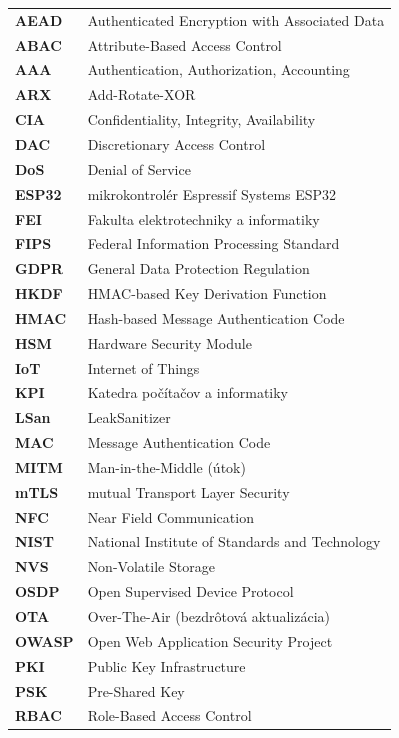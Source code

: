\documentclass[journal,a4paper,onecolumn]{IEEEtran}
\begin{document}
\bigskip\noindent
\begin{tabular}{>{\bfseries}p{2.8cm} p{12.2cm}}
AEAD   & Authenticated Encryption with Associated Data \\[2pt]
ABAC   & Attribute-Based Access Control \\[2pt]
AAA    & Authentication, Authorization, Accounting \\[2pt]
ARX    & Add-Rotate-XOR \\[2pt]
CIA    & Confidentiality, Integrity, Availability \\[2pt]
DAC    & Discretionary Access Control \\[2pt]
DoS    & Denial of Service \\[2pt]
ESP32  & mikrokontrolér Espressif Systems ESP32 \\[2pt]
FEI    & Fakulta elektrotechniky a informatiky \\[2pt]
FIPS   & Federal Information Processing Standard \\[2pt]
GDPR   & General Data Protection Regulation \\[2pt]
HKDF   & HMAC-based Key Derivation Function \\[2pt]
HMAC   & Hash-based Message Authentication Code \\[2pt]
HSM    & Hardware Security Module \\[2pt]
IoT    & Internet of Things \\[2pt]
KPI    & Katedra počítačov a informatiky \\[2pt]
LSan   & LeakSanitizer \\[2pt]
MAC    & Message Authentication Code \\[2pt]
MITM   & Man-in-the-Middle (útok) \\[2pt]
mTLS   & mutual Transport Layer Security \\[2pt]
NFC    & Near Field Communication \\[2pt]
NIST   & National Institute of Standards and Technology \\[2pt]
NVS    & Non-Volatile Storage \\[2pt]
OSDP   & Open Supervised Device Protocol \\[2pt]
OTA    & Over-The-Air (bezdrôtová aktualizácia) \\[2pt]
OWASP  & Open Web Application Security Project \\[2pt]
PKI    & Public Key Infrastructure \\[2pt]
PSK    & Pre-Shared Key \\[2pt]
RBAC   & Role-Based Access Control \\[2pt]

\end{tabular}
\end{document}
